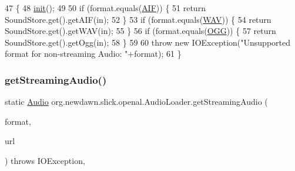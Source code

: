 \begin{DoxyCode}
47                                                                                    \{
48         \mbox{\hyperlink{classorg_1_1newdawn_1_1slick_1_1openal_1_1_audio_loader_ad2d2f4bb59fef206981fbe0896ecc87c}{init}}();
49         
50         \textcolor{keywordflow}{if} (format.equals(\mbox{\hyperlink{classorg_1_1newdawn_1_1slick_1_1openal_1_1_audio_loader_a024d05c95399aa1523b15b37c34d58b6}{AIF}})) \{
51             \textcolor{keywordflow}{return} SoundStore.get().getAIF(in);
52         \}
53         \textcolor{keywordflow}{if} (format.equals(\mbox{\hyperlink{classorg_1_1newdawn_1_1slick_1_1openal_1_1_audio_loader_a34a9e47a5090ab343885f032a800082d}{WAV}})) \{
54             \textcolor{keywordflow}{return} SoundStore.get().getWAV(in);
55         \}
56         \textcolor{keywordflow}{if} (format.equals(\mbox{\hyperlink{classorg_1_1newdawn_1_1slick_1_1openal_1_1_audio_loader_ad4fe9acae97947804dc4c70ef7bbff24}{OGG}})) \{
57             \textcolor{keywordflow}{return} SoundStore.get().getOgg(in);
58         \}
59         
60         \textcolor{keywordflow}{throw} \textcolor{keyword}{new} IOException(\textcolor{stringliteral}{"Unsupported format for non-streaming Audio: "}+format);
61     \}
\end{DoxyCode}
\mbox{\label{classorg_1_1newdawn_1_1slick_1_1openal_1_1_audio_loader_aa74731b7521ad2ee66779ff471d85d2b}} 
\subsubsection{\texorpdfstring{get\+Streaming\+Audio()}{getStreamingAudio()}}
{\footnotesize\ttfamily static \mbox{\hyperlink{interfaceorg_1_1newdawn_1_1slick_1_1openal_1_1_audio}{Audio}} org.\+newdawn.\+slick.\+openal.\+Audio\+Loader.\+get\+Streaming\+Audio (\begin{DoxyParamCaption}\item[{String}]{format,  }\item[{U\+RL}]{url }\end{DoxyParamCaption}) throws I\+O\+Exception\hspace{0.3cm}{\ttfamily [inline]}, {\ttfamily [static]}}

